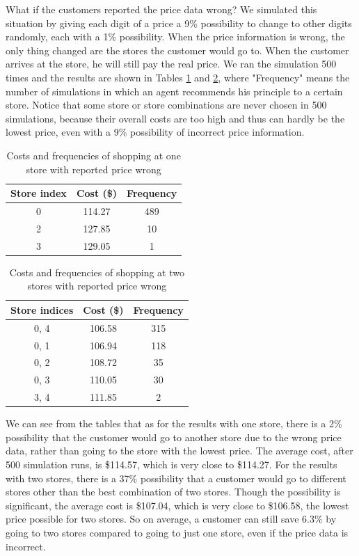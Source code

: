 What if the customers reported the price data wrong? We simulated this situation by giving each digit of a price a 9\% possibility to change to other digits randomly, each with a 1\% possibility. When the price information is wrong, the only thing changed are the stores the customer would go to. When the customer arrives at the store, he will still pay the real price. We ran the simulation 500 times and the results are shown in Tables \ref{ch2:t10} and \ref{ch2:t11}, where "Frequency" means the number of simulations in which an agent recommends his principle to a certain store. Notice that some store or store combinations are never chosen in 500 simulations, because their overall costs are too high and thus can hardly be the lowest price, even with a 9\% possibility of incorrect price information. 

\begin{table}[!t]
\caption{Costs and frequencies of shopping at one store with reported price wrong}

\centering
\begin{tabular}{|c|c|c|}
\hline
\textbf{Store index} & \textbf{Cost (\$)}& \textbf{Frequency}\\ \hline
0& 114.27 & 489\\ \hline
2& 127.85 & 10\\ \hline
3& 129.05 & 1\\ \hline
\end{tabular}
\label{ch2:t10}
\end{table}

\begin{table}[!t]
\caption{Costs and frequencies of shopping at two stores with reported price wrong}

\centering
\begin{tabular}{|c|c|c|}
\hline
\textbf{Store indices} & \textbf{Cost (\$)}  &\textbf{Frequency}\\ \hline
 0, 4& 106.58& 315 \\ \hline
 0, 1& 106.94& 118\\ \hline
 0, 2& 108.72& 35\\ \hline
 0, 3& 110.05& 30\\ \hline
 3, 4& 111.85&2\\ \hline
\end{tabular}
\label{ch2:t11}
\end{table}

We can see from the tables that as for the results with one store, there is a 2\% possibility that the customer would go to another store due to the wrong price data, rather than going to the store with the lowest price. The average cost, after 500 simulation runs, is \$114.57, which is very close to \$114.27. For the results with two stores, there is a 37\% possibility that a customer would go to different stores other than the best combination of two stores. Though the possibility is significant, the average cost is \$107.04, which is very close to \$106.58, the lowest price possible for two stores. So on average, a customer can still save 6.3\% by going to two stores compared to going to just one store, even if the price data is incorrect.

